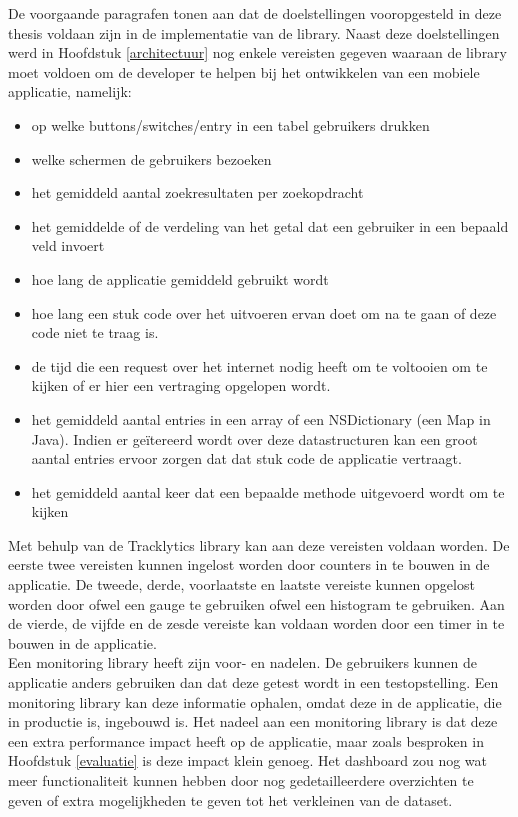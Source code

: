 De voorgaande paragrafen tonen aan dat de doelstellingen vooropgesteld in deze thesis voldaan zijn in de implementatie van de library. Naast deze doelstellingen werd in Hoofdstuk \ref{architectuur} nog enkele vereisten gegeven waaraan de library moet voldoen om de developer te helpen bij het ontwikkelen van een mobiele applicatie, namelijk: 
\begin{itemize}
\item op welke buttons/switches/entry in een tabel gebruikers drukken
\item welke schermen de gebruikers bezoeken
\item het gemiddeld aantal zoekresultaten per zoekopdracht
\item het gemiddelde of de verdeling van het getal dat een gebruiker in een bepaald veld invoert
\item hoe lang de applicatie gemiddeld gebruikt wordt
\item hoe lang een stuk code over het uitvoeren ervan doet om na te gaan of deze code niet te traag is.
\item de tijd die een request over het internet nodig heeft om te voltooien om te kijken of er hier een vertraging opgelopen wordt.
\item het gemiddeld aantal entries in een array of een NSDictionary (een Map in Java). Indien er ge\"itereerd wordt over deze datastructuren kan een groot aantal entries ervoor zorgen dat dat stuk code de applicatie vertraagt.
\item het gemiddeld aantal keer dat een bepaalde methode uitgevoerd wordt om te kijken
\end{itemize}

Met behulp van de Tracklytics library kan aan deze vereisten voldaan worden. De eerste twee vereisten kunnen ingelost worden door counters in te bouwen in de applicatie. De tweede, derde, voorlaatste en laatste vereiste kunnen opgelost worden door ofwel een gauge te gebruiken ofwel een histogram te gebruiken. Aan de vierde, de vijfde en de zesde vereiste kan voldaan worden door een timer in te bouwen in de applicatie.\\

Een monitoring library heeft zijn voor- en nadelen. De gebruikers kunnen de applicatie anders gebruiken dan dat deze getest wordt in een testopstelling. Een monitoring library kan deze informatie ophalen, omdat deze in de applicatie, die in productie is, ingebouwd is. Het nadeel aan een monitoring library is dat deze een extra performance impact heeft op de applicatie, maar zoals besproken in Hoofdstuk \ref{evaluatie} is deze impact klein genoeg. Het dashboard zou nog wat meer functionaliteit kunnen hebben door nog gedetailleerdere overzichten te geven of extra mogelijkheden te geven tot het verkleinen van de dataset. \\

